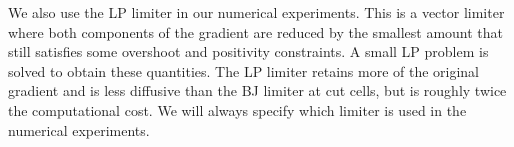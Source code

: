 We also use the LP limiter in our numerical experiments. This is a vector limiter where both components of the gradient are reduced by the smallest amount that still satisfies some overshoot and positivity constraints. A small LP problem is solved to  obtain these quantities.
The LP limiter retains more of the original gradient and is less diffusive than the BJ limiter at cut cells, but is roughly twice the computational cost. We will always specify which limiter is used in the numerical experiments.  

